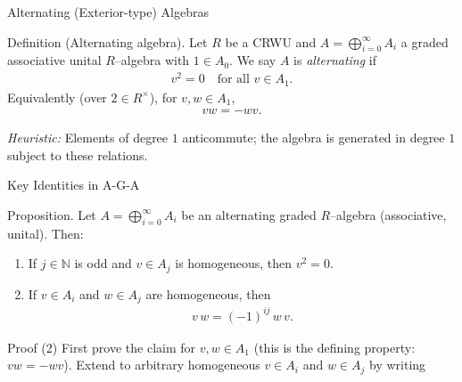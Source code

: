 \begin{frame}{Alternating (Exterior-type) Algebras}
\begin{block}{Definition (Alternating algebra).}
Let $R$ be a CRWU and $A=\bigoplus_{i=0}^\infty A_i$ a graded associative unital $R$–algebra with $1\in A_0$.
We say $A$ is \emph{alternating} if
\begin{align*}
v^2=0 \quad \text{for all } v\in A_1.
\end{align*}
Equivalently (over $2\in R^\times$), for $v,w\in A_1$,
\begin{align*}
vw = -wv.
\end{align*}
\end{block}
\textit{Heuristic:} Elements of degree $1$ anticommute; the algebra is generated in degree $1$ subject to these relations.
\end{frame}

\begin{frame}{Key Identities in A-G-A}
\begin{block}{Proposition.}
Let $A=\bigoplus_{i=0}^\infty A_i$ be an alternating graded $R$–algebra (associative, unital). Then:
\begin{enumerate}
\item If $j\in\mathbb{N}$ is odd and $v\in A_j$ is homogeneous, then $v^2=0$.
\item If $v\in A_i$ and $w\in A_j$ are homogeneous, then
\begin{align*}
v\,w = (-1)^{ij} \, w\,v .
\end{align*}
\end{enumerate}
\end{block}

\begin{block}{Proof}
(2) First prove the claim for $v,w\in A_1$ (this is the defining property: $vw=-wv$).
Extend to arbitrary homogeneous $v\in A_i$ and $w\in A_j$ by writing
\end{block}
\end{frame}

